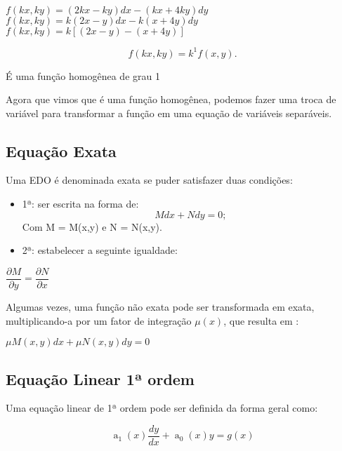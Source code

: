 \begin{center}
$ f(kx,ky) = (2kx - ky)dx  - (kx + 4ky)dy$ \\
$ f(kx,ky) = k(2x - y)dx - k(x + 4y)dy  $ \\
$ f(kx,ky) = k[(2x - y) - (x + 4y)] $ 
\end{center}
\begin{equation}
f(kx,ky) = k^1 f(x,y).
\end{equation}

É uma função homogênea de grau 1

Agora que vimos que é uma função homogênea, podemos fazer uma troca de variável para transformar a função em uma equação de variáveis separáveis. 


\subsection[Equação Exata]{Equação Exata}

Uma EDO é denominada exata se puder satisfazer duas condições: 

\begin{itemize}
\item{1ª:} ser escrita na forma de: 
\begin{equation}
Mdx + Ndy = 0;
\end{equation}
Com M = M(x,y) e N = N(x,y).
\item{2ª:} estabelecer a seguinte igualdade:
\end{itemize}

\begin{center}
$ \dfrac{ \partial M}{ \partial y} =  \dfrac{ \partial  N}{ \partial x} $
\end{center}

Algumas vezes, uma função não exata pode ser transformada em exata, multiplicando-a por um fator de integração $\mu(x)$, que resulta em : 

\begin{center}
$ \mu M(x,y)dx + \mu N(x,y)dy = 0 $
\end{center}

\subsection[Equação Linear 1ª ordem]{Equação Linear 1ª ordem}
Uma equação linear de 1ª ordem pode ser definida da forma geral como: 

\begin{equation} \label{formaLinear}
  \operatorname{a}_{1}(x)\dfrac{dy}{dx} + \operatorname{a}_{0}(x)y = g(x) 
\end{equation}

